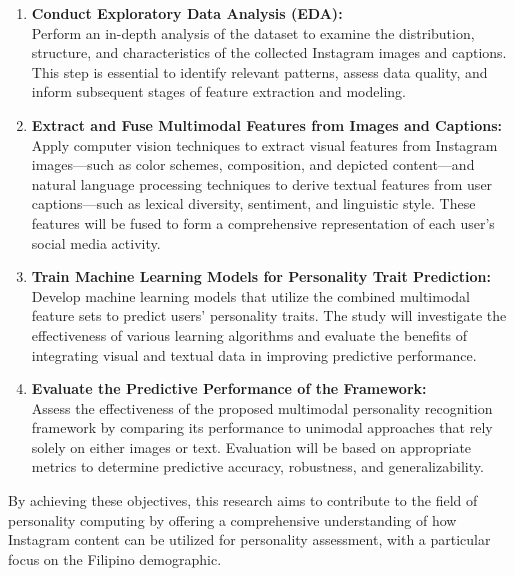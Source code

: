 \begin{enumerate}
	\item \textbf{Conduct Exploratory Data Analysis (EDA):} \\
	Perform an in-depth analysis of the dataset to examine the distribution, structure, and characteristics of the collected Instagram images and captions. This step is essential to identify relevant patterns, assess data quality, and inform subsequent stages of feature extraction and modeling.
	
	\item \textbf{Extract and Fuse Multimodal Features from Images and Captions:} \\
	Apply computer vision techniques to extract visual features from Instagram images—such as color schemes, composition, and depicted content—and natural language processing techniques to derive textual features from user captions—such as lexical diversity, sentiment, and linguistic style. These features will be fused to form a comprehensive representation of each user's social media activity.
	
	\item \textbf{Train Machine Learning Models for Personality Trait Prediction:} \\
	Develop machine learning models that utilize the combined multimodal feature sets to predict users’ personality traits. The study will investigate the effectiveness of various learning algorithms and evaluate the benefits of integrating visual and textual data in improving predictive performance.
	
	\item \textbf{Evaluate the Predictive Performance of the Framework:} \\
	Assess the effectiveness of the proposed multimodal personality recognition framework by comparing its performance to unimodal approaches that rely solely on either images or text. Evaluation will be based on appropriate metrics to determine predictive accuracy, robustness, and generalizability.
\end{enumerate}

By achieving these objectives, this research aims to contribute to the field of personality computing by offering a comprehensive understanding of how Instagram content can be utilized for personality assessment, with a particular focus on the Filipino demographic.


